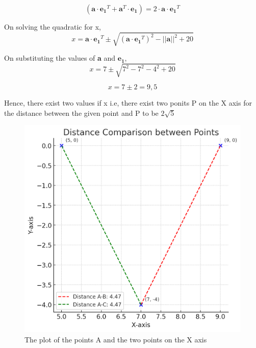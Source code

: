 \documentclass[journal,12pt,onecolumn]{IEEEtran}
\begin{document}
\begin{equation}
(\textbf{a}\cdot \mathbf{e_1}^T + \textbf{a}^T\cdot \mathbf{e_1} ) = 2\cdot \textbf{a}\cdot \mathbf{e_1}^T
\end{equation}

    \noindent On solving the quadratic for x, 
\begin{equation}
x = \textbf{a}\cdot \mathbf{e_1}^T \pm \sqrt{(\textbf{a}\cdot \mathbf{e_1}^T)^2 - ||\textbf{a}||^2 + 20}
\end{equation}

    \noindent On substituting the values of \textbf{a} and $\mathbf{e_1}$,
\begin{equation}
x = 7 \pm \sqrt{7^2 - 7^2 - 4^2 + 20}
\end{equation}

\begin{equation}
x = 7 \pm 2 = 9 , 5
\end{equation}

   \noindent Hence, there exist two values if x i.e, there exist two ponits P on the X axis for the distance between the given point and P to be $2\sqrt{5}$ 

\begin{figure}[h]
    \centering
    \includegraphics[width=0.5\linewidth]{figs/image.png}
    \caption{The plot of the points A and the two points on the X axis}
\end{figure}
\end{document}
